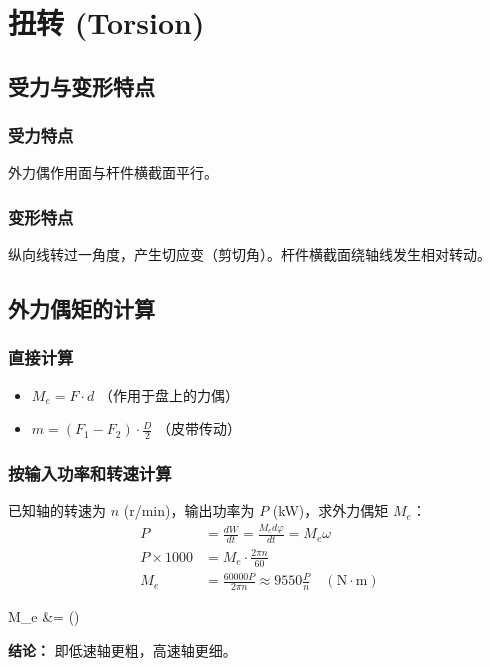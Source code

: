\chapter{扭转 (Torsion)}

\section{受力与变形特点}

\subsection{受力特点}
外力偶作用面与杆件横截面平行。

\subsection{变形特点}
纵向线转过一角度，产生切应变（剪切角）。杆件横截面绕轴线发生相对转动。


\section{外力偶矩的计算}

\subsection{直接计算}
\begin{itemize}
    \item $M_e = F \cdot d$ （作用于盘上的力偶）
    \item $m = (F_1 - F_2) \cdot \frac{D}{2}$ （皮带传动）
\end{itemize}

\subsection{按输入功率和转速计算}
已知轴的转速为 $n$ (r/min)，输出功率为 $P$ (kW)，求外力偶矩 $M_e$：
\begin{align*}
    P &= \frac{dW}{dt} = \frac{M_e d\varphi}{dt} = M_e \omega \\
    P \times 1000 &= M_e \cdot \frac{2\pi n}{60} \\
    M_e &= \frac{60000 P}{2\pi n} \approx 9550 \frac{P}{n} \quad (\text{N}\cdot\text{m})
\end{align*}
\begin{myformula}
        M_e &=    \quad (\cdot{})
    \end{myformula}
\textbf{结论：} 即低速轴更粗，高速轴更细。



